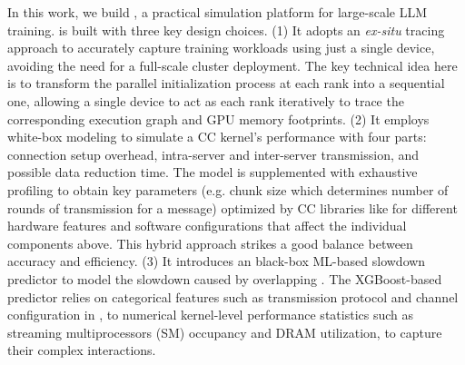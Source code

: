 In this work, we build \sys, a practical simulation platform for large-scale LLM training. 
\sys is built with three key design choices.
(1) It adopts an \textit{ex-situ} tracing approach to accurately capture training workloads using just a single device, avoiding the need for a full-scale cluster deployment. The key technical idea here is to transform the parallel initialization process at each rank into a sequential one, allowing a single device to act as each rank iteratively to trace the corresponding execution graph and GPU memory footprints.
(2) It employs white-box modeling to simulate a CC kernel's performance with four parts: connection setup overhead, intra-server and inter-server transmission, and possible data reduction time. 
The model is supplemented with exhaustive profiling to obtain key parameters (e.g. chunk size which determines number of rounds of transmission for a message) optimized by CC libraries like \nccl for different hardware features and software configurations that affect the individual components above.
This hybrid approach strikes a good balance between accuracy and efficiency.
(3) It introduces an black-box ML-based slowdown predictor to model the slowdown caused by overlapping \ops. 
The XGBoost-based predictor relies on categorical features such as transmission protocol and channel configuration in \nccl, to numerical kernel-level performance statistics such as streaming multiprocessors (SM) occupancy and DRAM utilization, to capture their complex interactions.


